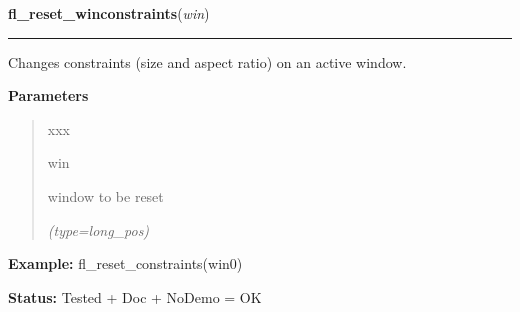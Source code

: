 \hspace{.8\funcindent}\begin{boxedminipage}{\funcwidth}

    \raggedright \textbf{fl\_reset\_winconstraints}(\textit{win})

    \vspace{-1.5ex}

    \rule{\textwidth}{0.5\fboxrule}
\setlength{\parskip}{2ex}
    Changes constraints (size and aspect ratio) on an active window.

\setlength{\parskip}{1ex}
      \textbf{Parameters}
      \vspace{-1ex}

      \begin{quote}
        \begin{Ventry}{xxx}

          \item[win]

          window to be reset

            {\it (type=long\_pos)}

        \end{Ventry}

      \end{quote}

\textbf{Example:} fl\_reset\_constraints(win0)



\textbf{Status:} Tested + Doc + NoDemo = OK



    \end{boxedminipage}

    \label{xformslib:flxbasic:fl_winsize}

    \vspace{0.5ex}

